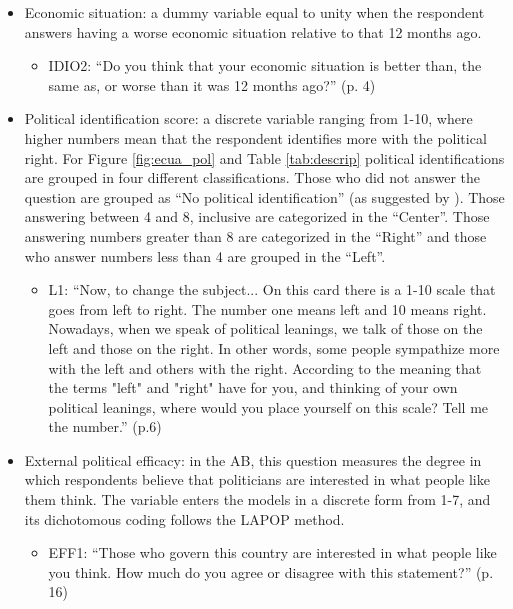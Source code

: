 \documentclass[floatsintext,man]{apa7}\usepackage[]{graphicx}\usepackage[]{color}
\begin{document}
\begin{itemize}
\item Economic situation: a dummy variable equal to unity when the respondent answers having a worse economic situation relative to that 12 months ago. 
  \begin{itemize}
    \item IDIO2: \enquote{Do you think that your economic situation is better than, the same
as, or worse than it was 12 months ago?} (p. 4)
  \end{itemize}  

  \item Political identification score: a discrete variable ranging from 1-10, where higher numbers mean that the respondent identifies more with the political right. For Figure \ref{fig:ecua_pol} and Table \ref{tab:descrip} political identifications are grouped in four different classifications. Those who did not answer the question are grouped as \enquote{No political identification} (as suggested by \textcite{Moncagatta.2020}). Those answering between 4 and 8, inclusive are categorized in the \enquote{Center}. Those answering numbers greater than 8 are categorized in the \enquote{Right} and those who answer numbers less than 4 are grouped in the \enquote{Left}. 
  \begin{itemize}
    \item L1: \enquote{Now, to change the subject... On this card there is a 1-10 scale
that goes from left to right. The number one means left and 10
means right. Nowadays, when we speak of political leanings, we
talk of those on the left and those on the right. In other words,
some people sympathize more with the left and others with the
right. According to the meaning that the terms "left" and "right"
have for you, and thinking of your own political leanings, where
would you place yourself on this scale? Tell me the number.} (p.6)
  \end{itemize}

\item External political efficacy: in the AB, this question measures the degree in which respondents believe that politicians are interested in what people like them think. The variable enters the models in a discrete form from 1-7, and its dichotomous coding follows the LAPOP method. 
  \begin{itemize}
    \item EFF1: \enquote{Those who govern this country are interested in what people like
you think. How much do you agree or disagree with this statement?} (p. 16)
  \end{itemize}  
  

\end{itemize}
\end{document}
